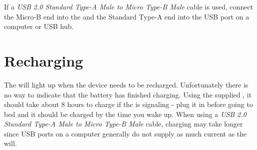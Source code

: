 \par\medskip

If a \textit{USB 2.0 Standard Type-A Male to Micro Type-B Male} cable is used,
connect the Micro-B end into the  and the Standard Type-A end into the
USB port on a computer or USB hub.

\section{Recharging} \label{Recharging}

The \hyperref[Low Battery Indicator]{} will light up when the device
needs to be recharged.  Unfortunately there is no way to indicate that the
battery has finished charging. Using the supplied
\hyperref[Power Adapter]{}, it should take about \num{8} hours to charge
if the  is signaling - plug it in before going to bed and it should be
charged by the time you wake up.  When using a \textit{USB 2.0 Standard Type-A
Male to Micro Type-B Male} cable, charging may take longer since USB ports on a
computer generally do not supply as much current as the  will.

